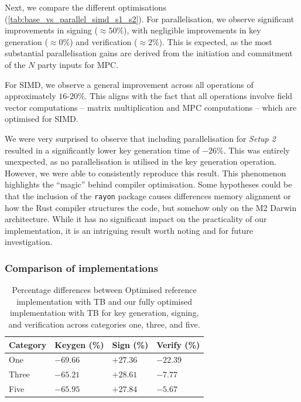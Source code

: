 \documentclass[11pt]{report}
\theoremstyle{definition}
\theoremstyle{plain}
\begin{document}
Next, we compare the different optimisations (\autoref{tab:base_vs_parallel_simd_s1_s2}). For parallelisation, we observe significant improvements in signing ($\approx 50\%$), with negligible improvements in key generation ($\approx 0\%$) and verification ($\approx 2\%$). This is expected, as the most substantial parallelisation gains are derived from the initiation and commitment of the $N$ party inputs for MPC.

For SIMD, we observe a general improvement across all operations of approximately $16$-$20\%$. This aligns with the fact that all operations involve field vector computations -- matrix multiplication and MPC computations -- which are optimised for SIMD.

We were very surprised to observe that including parallelisation for \textit{Setup 2} resulted in a significantly lower key generation time of $-26\%$. This was entirely unexpected, as no parallelisation is utilised in the key generation operation. However, we were able to consistently reproduce this result. This phenomenon highlights the ``magic'' behind compiler optimisation. Some hypotheses could be that the inclusion of the \texttt{rayon} package causes differences memory alignment or how the Rust compiler structures the code, but somehow only on the M2 Darwin architecture. While it has no significant impact on the practicality of our implementation, it is an intriguing result worth noting and for future investigation.

\subsubsection{Comparison of implementations}\label{sub:comparison_implementations}

\begin{table}[H]
  \centering
  \begin{tabular}{l|lll}
    \hline
    Category & Keygen (\%) & Sign (\%) & Verify (\%) \\
    \hline
    One      & $-69.66$    & $+27.36$  & $-22.39$    \\
    Three    & $-65.21$    & $+28.61$  & $-7.77$     \\
    Five     & $-65.95$    & $+27.84$  & $-5.67$     \\
    \hline
  \end{tabular}
  \caption{Percentage differences between Optimised reference implementation with TB and our fully optimised implementation with TB for key generation, signing, and verification across categories one, three, and five.}
  \label{tab:optimized_vs_simd_parallel_tb_new}
\end{table}
\end{document}
